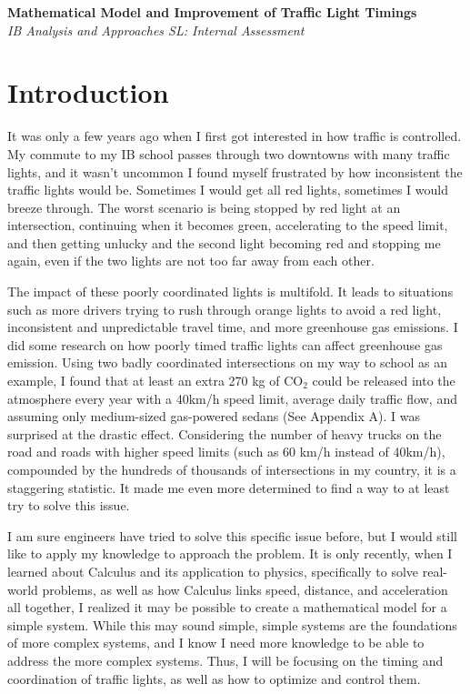 \documentclass[11pt]{article}
\begin{document}
\doublespacing
\begin{center}
\vspace*{2cm}
\textbf{\LARGE{Mathematical Model and Improvement of Traffic Light Timings}} \\
\vspace{2cm}
\textit{\large{IB Analysis and Approaches SL: Internal Assessment}} \\
\vspace{0.5cm}
\vfill
\end{center}
\clearpage


\section{Introduction}
It was only a few years ago when I first got interested in how traffic is controlled. My commute to my IB school passes through two downtowns with many traffic lights, and it wasn’t uncommon I found myself frustrated by how inconsistent the traffic lights would be. Sometimes I would get all red lights, sometimes I would breeze through. The worst scenario is being stopped by red light at an intersection, continuing when it becomes green, accelerating to the speed limit, and then getting unlucky and the second light becoming red and stopping me again, even if the two lights are not too far away from each other.

The impact of these poorly coordinated lights is multifold. It leads to situations such as more drivers trying to rush through orange lights to avoid a red light, inconsistent and unpredictable travel time, and more greenhouse gas emissions. I did some research on how poorly timed traffic lights can affect greenhouse gas emission. Using two badly coordinated intersections on my way to school as an example, I found that at least an extra 270 kg of CO$_2$ could be released into the atmosphere every year with a 40km/h speed limit, average daily traffic flow, and assuming only medium-sized gas-powered sedans (See Appendix A). I was surprised at the drastic effect. Considering the number of heavy trucks on the road and roads with higher speed limits (such as 60 km/h instead of 40km/h), compounded by the hundreds of thousands of intersections in my country, it is a staggering statistic. It made me even more determined to find a way to at least try to solve this issue.

I am sure engineers have tried to solve this specific issue before, but I would still like to apply my knowledge to approach the problem. It is only recently, when I learned about Calculus and its application to physics, specifically to solve real-world problems, as well as how Calculus links speed, distance, and acceleration all together, I realized it may be possible to create a mathematical model for a simple system. While this may sound simple, simple systems are the foundations of more complex systems, and I know I need more knowledge to be able to address the more complex systems. Thus, I will be focusing on the timing and coordination of traffic lights, as well as how to optimize and control them.
\end{document}

